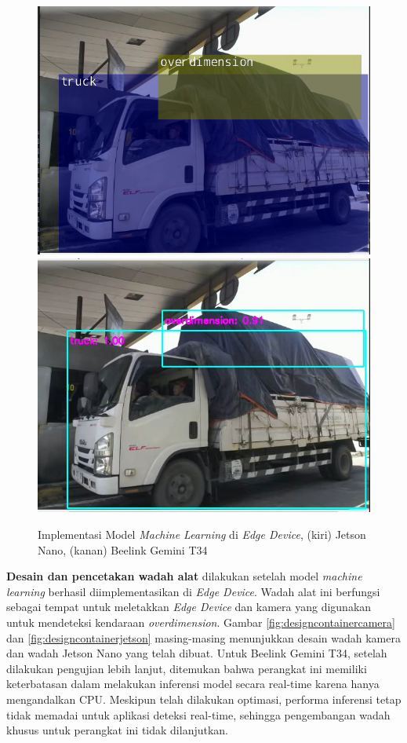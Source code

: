 \begin{figure}[htbp]
  \centering

  \includegraphics[scale=0.3]{gambar/bab3-implementasi-di-jetson.png}
  \includegraphics[scale=0.3]{gambar/bab3-implementasi-di-beelink.png}

  \caption{\centering Implementasi Model \emph{Machine Learning} di \emph{Edge Device}, (kiri) Jetson Nano, (kanan) Beelink Gemini T34}
  \label{fig:implementationedgedevice}
\end{figure}

\textbf{Desain dan pencetakan wadah alat} dilakukan setelah model \emph{machine learning} berhasil diimplementasikan di \emph{Edge Device}. Wadah alat ini berfungsi sebagai tempat untuk meletakkan \emph{Edge Device} dan kamera yang digunakan untuk mendeteksi kendaraan \emph{overdimension}. Gambar \ref{fig:designcontainercamera} dan \ref{fig:designcontainerjetson} masing-masing menunjukkan desain wadah kamera dan wadah Jetson Nano yang telah dibuat. Untuk Beelink Gemini T34, setelah dilakukan pengujian lebih lanjut, ditemukan bahwa perangkat ini memiliki keterbatasan dalam melakukan inferensi model secara real-time karena hanya mengandalkan CPU. Meskipun telah dilakukan optimasi, performa inferensi tetap tidak memadai untuk aplikasi deteksi real-time, sehingga pengembangan wadah khusus untuk perangkat ini tidak dilanjutkan.

